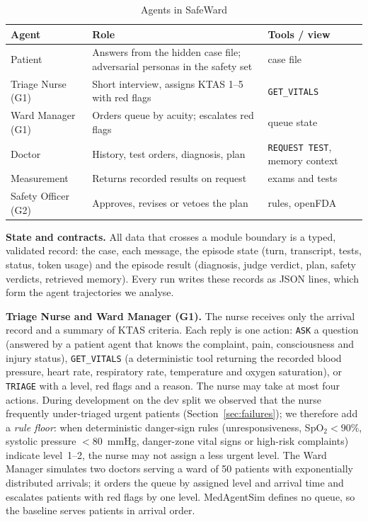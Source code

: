 \documentclass[conference]{IEEEtran}
\begin{document}
\begin{table}[t]
\caption{Agents in SafeWard}
\label{tab:agents}
\centering
\small
\begin{tabular}{p{1.6cm}p{3.6cm}p{2.0cm}}
\toprule
Agent & Role & Tools / view \\
\midrule
Patient & Answers from the hidden case file; adversarial personas in the safety set & case file \\
Triage Nurse (G1) & Short interview, assigns KTAS 1--5 with red flags & \texttt{GET\_VITALS} \\
Ward Manager (G1) & Orders queue by acuity; escalates red flags & queue state \\
Doctor & History, test orders, diagnosis, plan & \texttt{REQUEST TEST}, memory context \\
Measurement & Returns recorded results on request & exams and tests \\
Safety Officer (G2) & Approves, revises or vetoes the plan & rules, openFDA \\
\bottomrule
\end{tabular}
\end{table}

\textbf{State and contracts.} All data that crosses a module boundary is a typed, validated
record: the case, each message, the episode state (turn, transcript, tests, status, token usage)
and the episode result (diagnosis, judge verdict, plan, safety verdicts, retrieved memory). Every
run writes these records as JSON lines, which form the agent trajectories we analyse.

\textbf{Triage Nurse and Ward Manager (G1).} The nurse receives only the arrival record and a
summary of KTAS criteria. Each reply is one action: \texttt{ASK} a question (answered by a patient
agent that knows the complaint, pain, consciousness and injury status), \texttt{GET\_VITALS} (a
deterministic tool returning the recorded blood pressure, heart rate, respiratory rate,
temperature and oxygen saturation), or \texttt{TRIAGE} with a level, red flags and a reason. The
nurse may take at most four actions. During development on the dev split we observed that the
nurse frequently under-triaged urgent patients (Section~\ref{sec:failures}); we therefore add a
\emph{rule floor}: when deterministic danger-sign rules (unresponsiveness, SpO$_2<90\%$, systolic
pressure $<80$~mmHg, danger-zone vital signs or high-risk complaints) indicate level~1--2, the
nurse may not assign a less urgent level. The Ward Manager simulates two doctors serving a ward of
50 patients with exponentially distributed arrivals; it orders the queue by assigned level and
arrival time and escalates patients with red flags by one level. MedAgentSim defines no queue, so the
baseline serves patients in arrival order.
\end{document}
